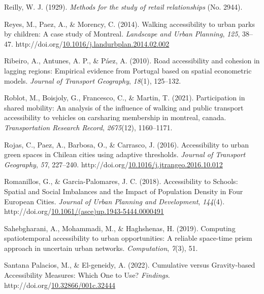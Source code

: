 \documentclass[
11pt, %
oneside, %
english, %
singlespacing, %
]{macthesis} %
\newlength{\cslhangindent}
\newenvironment{CSLReferences}[2] %
{\begin{list}{}{%
	\setlength{\itemindent}{0pt}
	\setlength{\leftmargin}{0pt}
	\setlength{\parsep}{0pt}
	\ifodd #1
	\setlength{\leftmargin}{\cslhangindent}
	\setlength{\itemindent}{-1\cslhangindent}
	\fi
	\setlength{\itemsep}{#2\baselineskip}}}
{\end{list}}
\begin{document}
\begin{CSLReferences}{1}{0}
Reilly, W. J. (1929). \emph{Methods for the study of retail relationships} (No. 2944).

Reyes, M., Paez, A., \& Morency, C. (2014). Walking accessibility to urban parks by children: {A} case study of {Montreal}. \emph{Landscape and Urban Planning}, \emph{125}, 38--47. http://doi.org/\href{https://doi.org/10.1016/j.landurbplan.2014.02.002}{10.1016/j.landurbplan.2014.02.002}

Ribeiro, A., Antunes, A. P., \& Páez, A. (2010). Road accessibility and cohesion in lagging regions: {Empirical} evidence from {Portugal} based on spatial econometric models. \emph{Journal of Transport Geography}, \emph{18}(1), 125--132.

Roblot, M., Boisjoly, G., Francesco, C., \& Martin, T. (2021). Participation in shared mobility: An analysis of the influence of walking and public transport accessibility to vehicles on carsharing membership in montreal, canada. \emph{Transportation Research Record}, \emph{2675}(12), 1160--1171.

Rojas, C., Paez, A., Barbosa, O., \& Carrasco, J. (2016). Accessibility to urban green spaces in {Chilean} cities using adaptive thresholds. \emph{Journal of Transport Geography}, \emph{57}, 227--240. http://doi.org/\href{https://doi.org/10.1016/j.jtrangeo.2016.10.012}{10.1016/j.jtrangeo.2016.10.012}

Romanillos, G., \& Garcia-Palomares, J. C. (2018). Accessibility to {Schools}: {Spatial} and {Social} {Imbalances} and the {Impact} of {Population} {Density} in {Four} {European} {Cities}. \emph{Journal of Urban Planning and Development}, \emph{144}(4). http://doi.org/\href{https://doi.org/10.1061/(asce)up.1943-5444.0000491}{10.1061/(asce)up.1943-5444.0000491}

Sahebgharani, A., Mohammadi, M., \& Haghshenas, H. (2019). Computing spatiotemporal accessibility to urban opportunities: A reliable space-time prism approach in uncertain urban networks. \emph{Computation}, \emph{7}(3), 51.

Santana Palacios, M., \& El-geneidy, A. (2022). Cumulative versus Gravity-based Accessibility Measures: Which One to Use? \emph{Findings}. http://doi.org/\href{https://doi.org/10.32866/001c.32444}{10.32866/001c.32444}


\end{CSLReferences}
\end{document}
